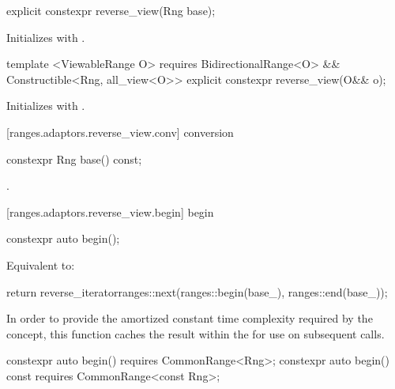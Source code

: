 %
\begin{itemdecl}
explicit constexpr reverse_view(Rng base);
\end{itemdecl}

\begin{itemdescr}
\pnum
\effects Initializes  with .
\end{itemdescr}

%
\begin{itemdecl}
template <ViewableRange O>
  requires BidirectionalRange<O> && Constructible<Rng, all_view<O>>
explicit constexpr reverse_view(O&& o);
\end{itemdecl}

\begin{itemdescr}
\pnum
\effects Initializes  with .
\end{itemdescr}

[ranges.adaptors.reverse_view.conv]{ conversion}

%
\begin{itemdecl}
constexpr Rng base() const;
\end{itemdecl}

\begin{itemdescr}
\pnum
\returns {}.
\end{itemdescr}

[ranges.adaptors.reverse_view.begin]{ begin}

%
\begin{itemdecl}
constexpr auto begin();
\end{itemdecl}

\begin{itemdescr}
\pnum
\effects Equivalent to:
\begin{codeblock}
return reverse_iterator{ranges::next(ranges::begin(base_), ranges::end(base_))};
\end{codeblock}

\pnum
\remarks In order to provide the amortized constant time complexity required by
the  concept, this function caches the result within the
 for use on subsequent calls.
\end{itemdescr}

%
\begin{itemdecl}
constexpr auto begin() requires CommonRange<Rng>;
constexpr auto begin() const requires CommonRange<const Rng>;
\end{itemdecl}

